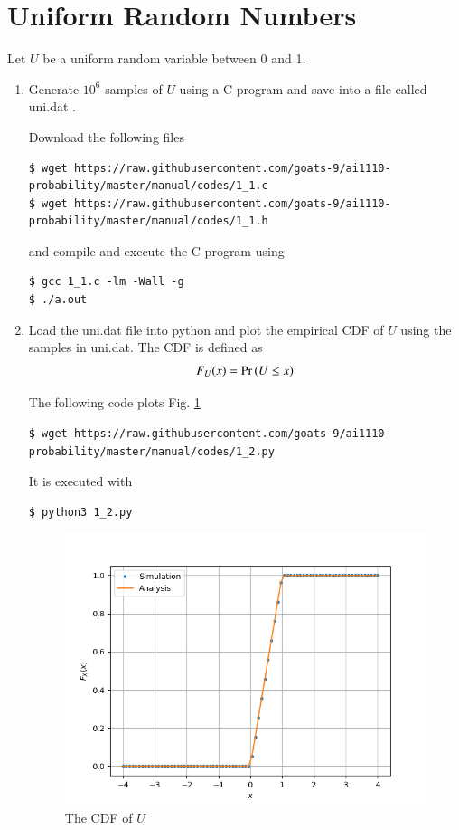 \documentclass[journal,12pt,twocolumn]{IEEEtran}
\renewcommand\thesection{\arabic{section}}
\begin{document}
\section{Uniform Random Numbers}
Let $U$ be a uniform random variable between 0 and 1.
\begin{enumerate}[label=\thesection.\arabic*
,ref=\thesection.\theenumi]
\item Generate $10^6$ samples of $U$ using a C program and save into a file called uni.dat .

\solution Download the following files
\begin{lstlisting}
$ wget https://raw.githubusercontent.com/goats-9/ai1110-probability/master/manual/codes/1_1.c
$ wget https://raw.githubusercontent.com/goats-9/ai1110-probability/master/manual/codes/1_1.h
\end{lstlisting}
and compile and execute the C program using
\begin{lstlisting}
$ gcc 1_1.c -lm -Wall -g
$ ./a.out
\end{lstlisting}

%
\item
Load the uni.dat file into python and plot the empirical CDF of $U$ using the samples in uni.dat. The CDF is defined as
\begin{align}
F_{U}(x) = \Pr\left(U \leq x\right)
\end{align}

\solution  The following code plots Fig. \ref{fig:uni_cdf}
\begin{lstlisting}
$ wget https://raw.githubusercontent.com/goats-9/ai1110-probability/master/manual/codes/1_2.py
\end{lstlisting}
It is executed with
\begin{lstlisting}
$ python3 1_2.py
\end{lstlisting}
\begin{figure}
\centering
\includegraphics[width=\columnwidth]{./figs/1_2.png}
\caption{The CDF of $U$}
\label{fig:uni_cdf}
\end{figure}


\end{enumerate}
\end{document}

